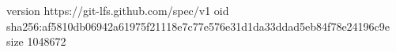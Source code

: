 version https://git-lfs.github.com/spec/v1
oid sha256:af5810db06942a61975f21118e7c77e576e31d1da33ddad5eb84f78e24196c9e
size 1048672
